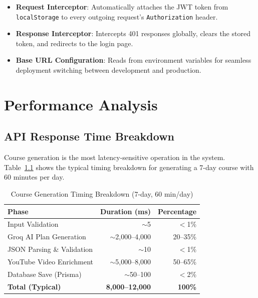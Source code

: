 \documentclass[12pt,a4paper]{report}
\begin{document}
\begin{itemize}[noitemsep]
    \item \textbf{Request Interceptor}: Automatically attaches the JWT token from \texttt{localStorage} to every outgoing request's \texttt{Authorization} header.
    \item \textbf{Response Interceptor}: Intercepts 401 responses globally, clears the stored token, and redirects to the login page.
    \item \textbf{Base URL Configuration}: Reads from environment variables for seamless deployment switching between development and production.
\end{itemize}


\chapter{Performance Analysis}

\section{API Response Time Breakdown}
Course generation is the most latency-sensitive operation in the system. Table~\ref{tab:perf-breakdown} shows the typical timing breakdown for generating a 7-day course with 60 minutes per day.

\begin{table}[H]
\centering
\caption{Course Generation Timing Breakdown (7-day, 60 min/day)}
\label{tab:perf-breakdown}
\begin{tabular}{l r r}
\toprule
\textbf{Phase}                    & \textbf{Duration (ms)} & \textbf{Percentage} \\
\midrule
Input Validation                  & $\sim$5                & $<$1\%  \\
Groq AI Plan Generation           & $\sim$2{,}000--4{,}000  & 20--35\% \\
JSON Parsing \& Validation        & $\sim$10               & $<$1\%  \\
YouTube Video Enrichment          & $\sim$5{,}000--8{,}000  & 50--65\% \\
Database Save (Prisma)            & $\sim$50--100          & $<$2\%  \\
\midrule
\textbf{Total (Typical)}          & \textbf{8{,}000--12{,}000} & \textbf{100\%} \\
\bottomrule
\end{tabular}
\end{table}
\end{document}
